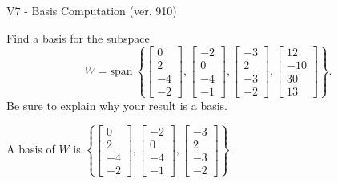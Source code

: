 \begin{exercise}
  \begin{exerciseTitle}V7 - Basis Computation (ver. 910)\end{exerciseTitle}
  \begin{exerciseStatement}
    Find a basis for the subspace 
\[W=\mathrm{span}\ \left\{\left[\begin{array}{r}
0 \\
2 \\
-4 \\
-2
\end{array}\right] , \left[\begin{array}{r}
-2 \\
0 \\
-4 \\
-1
\end{array}\right] , \left[\begin{array}{r}
-3 \\
2 \\
-3 \\
-2
\end{array}\right] , \left[\begin{array}{r}
12 \\
-10 \\
30 \\
13
\end{array}\right]\right\}.\]
 Be sure to explain why your result is a basis.


  \end{exerciseStatement}
  \begin{exerciseAnswer}
   A basis of \(W\) is  \(\left\{\left[\begin{array}{r}
0 \\
2 \\
-4 \\
-2
\end{array}\right] , \left[\begin{array}{r}
-2 \\
0 \\
-4 \\
-1
\end{array}\right] , \left[\begin{array}{r}
-3 \\
2 \\
-3 \\
-2
\end{array}\right]\right\}\).
  


  \end{exerciseAnswer}
\end{exercise}